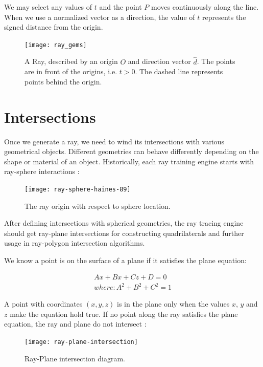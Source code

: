 \documentclass[12pt,a4paper,english]{article}
\begin{document}
We may select any values of $t$ and the point $P$ moves continuously along the line. When we use a normalized vector as a direction, the value of $t$ represents the signed distance from the origin.

\begin{figure}[H]
    \centering
    \texttt{[image: ray\_gems]}
    \caption[]{A Ray, described by an origin $O$ and direction vector $\hat{d}$. The points are in front of the origins, i.e. $t > 0$. The dashed line represents points behind the origin.}
    \label{fig:ray_gems}
\end{figure}

\section{Intersections}

Once we generate a ray, we need to wind its intersections with various geometrical objects. Different geometries can behave differently depending on the shape or material of an object. Historically, each ray training engine starts with ray-sphere interactions \cite{Haines_1989}:

\begin{figure}[H]
    \centering
    \texttt{[image: ray-sphere-haines-89]}
    \caption[]{The ray origin with respect to sphere location.}
    \label{fig:ray-sphere-haines-89}
\end{figure}

After defining intersections with spherical geometries, the ray tracing engine should get ray-plane intersections for constructing quadrilaterals and further usage in ray-polygon intersection algorithms.

We know a point is on the surface of a plane if it satisfies the plane equation:

\begin{equation}
    \begin{split}
    Ax + Bx + Cz + D = 0 \\ where: A^2 + B^2 + C^2 = 1
    \end{split}
\end{equation}

A point with coordinates $(x, y, z)$ is in the plane only when the values $x$, $y$ and $z$ make the equation hold true. If no point along the ray satisfies the plane equation, the ray and plane do not intersect \cite{Szauer_2017}:

\begin{figure}[H]
    \centering
    \texttt{[image: ray-plane-intersection]}
    \caption[]{Ray-Plane intersection diagram.}
    \label{fig:ray-plane-intersection}
\end{figure}
\end{document}
